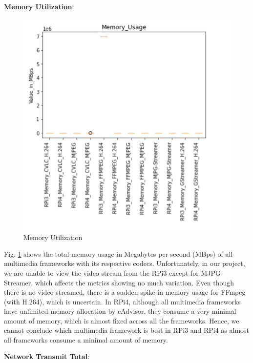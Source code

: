 \textbf{Memory Utilization}:

\begin{figure}[H]
   \centering
   \includegraphics[width=.8\textwidth]{images/Boxplots/Memory_Usage.png}
   \caption{Memory Utilization}
   \label{fig:memory_usage}
\end{figure}

Fig. \ref{fig:memory_usage} shows the total memory usage in Megabytes per second (MBps) of all multimedia frameworks with its respective codecs. Unfortunately, in our project, we are unable to view the video stream from the RPi3 except for MJPG-Streamer, which affects the metrics showing no much variation. Even though there is no video streamed, there is a sudden spike in memory usage for FFmpeg (with H.264), which is uncertain. In RPi4, although all multimedia frameworks have unlimited memory allocation by cAdvisor, they consume a very minimal amount of memory, which is almost fixed across all the frameworks. Hence, we cannot conclude which multimedia framework is best in RPi3 and RPi4 as almost all frameworks consume a minimal amount of memory.

\newpage
\textbf{Network Transmit Total}:

